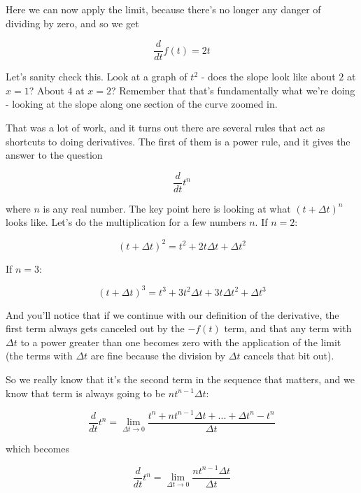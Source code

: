 Here we can now apply the limit, because there's no longer any danger of dividing by zero, and so we get

\begin{equation*}
    \frac{d}{dt}f(t) = 2t
\end{equation*}

Let's sanity check this. Look at a graph of $t^2$ - does the slope look like about $2$ at $x=1$? About $4$ at $x=2$? Remember that that's fundamentally what we're doing - looking at the slope along one section of the curve zoomed in.

That was a lot of work, and it turns out there are several rules that act as shortcuts to doing derivatives. The first of them is a power rule, and it gives the answer to the question

\begin{equation*}
    \frac{d}{dt}t^n
\end{equation*}

where $n$ is any real number. The key point here is looking at what $(t+\Delta t)^n$ looks like. Let's do the multiplication for a few numbers $n$. If $n = 2$:

\begin{equation*}
    (t+\Delta t)^2 = t^2 + 2t\Delta t + \Delta t^2
\end{equation*}

If $n = 3$:

\begin{equation*}
    (t+\Delta t)^3 = t^3 + 3t^2\Delta t + 3t\Delta t^2 + \Delta t^3
\end{equation*}

And you'll notice that if we continue with our definition of the derivative, the first term always gets canceled out by the $-f(t)$ term, and that any term with $\Delta t$ to a power greater than one becomes zero with the application of the limit (the terms with $\Delta t$ are fine because the division by $\Delta t$ cancels that bit out).

So we really know that it's the second term in the sequence that matters, and we know that term is always going to be $nt^{n-1}\Delta t$:

\begin{equation*}
    \frac{d}{dt}t^n = \lim\limits_{\Delta t\rightarrow 0} \frac{t^n + nt^{n-1}\Delta t + ... + \Delta t^n - t^n}{\Delta t}
\end{equation*}

which becomes

\begin{equation*}
    \frac{d}{dt}t^n = \lim\limits_{\Delta t\rightarrow 0} \frac{nt^{n-1}\Delta t}{\Delta t}
\end{equation*}

